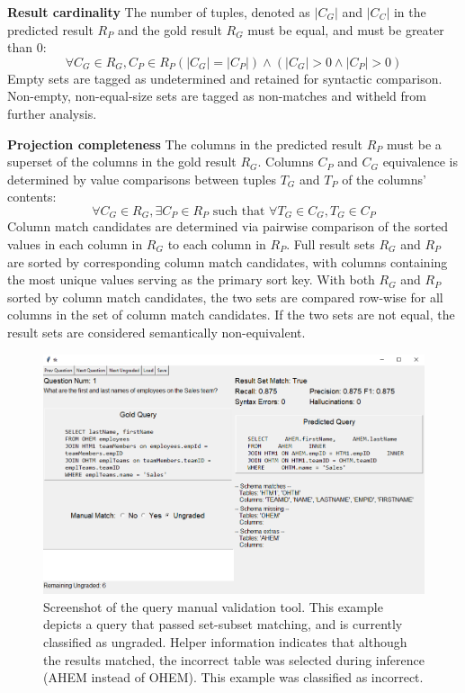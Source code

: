 \textbf{Result cardinality} The number of tuples, denoted as $|C_G|$ and $|C_C|$ in the predicted result $R_P$ and the gold result $R_G$ must be equal, and must be greater than 0:
$$\forall C_G \in R_G, C_P \in R_P \left(|C_G| = |C_P|\right) \land (|C_G| > 0 \land |C_P| > 0)$$
Empty sets are tagged as undetermined and retained for syntactic comparison. Non-empty, non-equal-size sets are tagged as non-matches and witheld from further analysis.

\textbf{Projection completeness} The columns in the predicted result $R_P$ must be a superset of the columns in the gold result $R_G$. Columns $C_P$ and $C_G$ equivalence is determined by value comparisons between tuples $T_G$ and $T_P$ of the columns' contents:
\[\forall C_G \in R_G, \exists C_P \in R_P \text{ such that } \forall T_G \in C_G, T_G \in C_P\]
Column match candidates are determined via pairwise comparison of the sorted values in each column in $R_G$ to each column in $R_P$. Full result sets $R_G$ and $R_P$ are sorted by corresponding column match candidates, with columns containing the most unique values serving as the primary sort key. With both $R_G$ and $R_P$ sorted by column match candidates, the two sets are compared row-wise for all columns in the set of column match candidates. If the two sets are not equal, the result sets are considered semantically non-equivalent.


\begin{figure}
  \centering
  \includegraphics[width=\linewidth]{figures/manual-validation-tool.PNG}
  \caption{Screenshot of the query manual validation tool. This example depicts a query that passed set-subset matching, and is currently classified as ungraded. Helper information indicates that although the results matched, the incorrect table was selected during inference (AHEM instead of OHEM). This example was classified as incorrect.}
  \label{fig:manual-validation-tool}
\end{figure}

